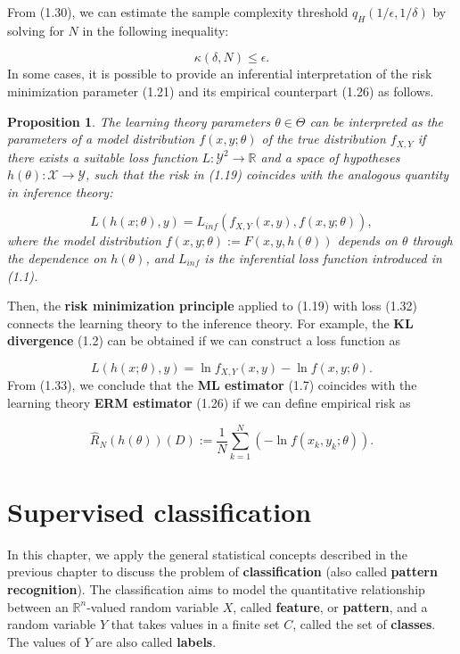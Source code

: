 \documentclass{report}
\newtheorem{proposition}{Proposition}[chapter]
\begin{document}
From (1.30), we can estimate the sample complexity threshold $q_H(1/\epsilon, 1/\delta)$ by solving for $N$ in the following inequality:

\begin{equation}
\kappa(\delta,N) \leq \epsilon.
\end{equation}
In some cases, it is possible to provide an inferential interpretation of the risk minimization parameter (1.21) and its empirical counterpart (1.26) as follows.

\begin{proposition}
The learning theory parameters $\theta \in \Theta$ can be interpreted as the parameters of a model distribution $f(x,y;\theta)$ of the true distribution $f_{X,Y}$ if there exists a suitable loss function $L : \mathcal{Y}^2 \to \mathbb{R}$ and a space of hypotheses $h(\theta): \mathcal{X} \to \mathcal{Y}$, such that the risk in (1.19) coincides with the analogous quantity in inference theory:

\begin{equation}
L(h(x;\theta), y) = L_{inf}(f_{X,Y}(x,y),f(x,y;\theta)),
\end{equation}
where the model distribution $f(x,y;\theta) := F(x,y,h(\theta))$ depends on $\theta$ through the dependence on $h(\theta)$, and $L_{inf}$ is the inferential loss function introduced in (1.1).
\end{proposition}
Then, the \textbf{risk minimization principle} applied to (1.19) with loss (1.32) connects the learning theory to the inference theory. For example, the \textbf{KL divergence} (1.2) can be obtained if we can construct a loss function as

\begin{equation}
L(h(x;\theta), y) = \ln f_{X,Y}(x,y) -\ln f(x,y;\theta).
\end{equation}
From (1.33), we conclude that the \textbf{ML estimator} (1.7) coincides with the learning theory \textbf{ERM estimator} (1.26) if we can define empirical risk as

\begin{equation}
\hat{R}_N(h(\theta))(D) := \frac{1}{N}\sum_{k=1}^N (-\ln f(x_k,y_k;\theta)).
\end{equation}

\chapter{Supervised classification}
In this chapter, we apply the general statistical concepts described in the previous chapter to discuss the problem of \textbf{classification} (also called \textbf{pattern recognition}). The classification aims to model the quantitative relationship between an $\mathbb{R}^n$-valued random variable $X$, called \textbf{feature}, or \textbf{pattern}, and a random variable $Y$ that takes values in a finite set $C$, called the set of \textbf{classes}. The values of $Y$ are also called \textbf{labels}.
\end{document}
